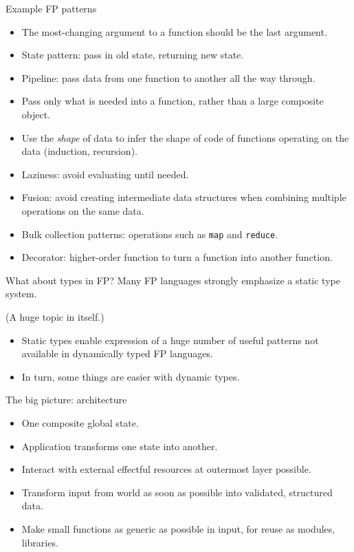 \begin{frame}{Example FP patterns}
  \begin{itemize}
  \item The most-changing argument to a function should be the last argument.
  \item State pattern: pass in old state, returning new state.
  \item Pipeline: pass data from one function to another all
    the way through.
  \item Pass only what is needed into a function, rather than a large
    composite object.
  \item Use the \emph{shape} of data to infer the shape of code of functions
    operating on the data (induction, recursion).
  \item Laziness: avoid evaluating until needed.
  \item Fusion: avoid creating intermediate data structures
    when combining multiple operations on the same data.
  \item Bulk collection patterns: operations such as
    \texttt{map} and \texttt{reduce}.
  \item Decorator: higher-order function to turn a function
    into another function.
  \end{itemize}
\end{frame}

\begin{frame}{What about types in FP?}
  Many FP languages strongly emphasize a static type system.

  (A huge topic in itself.)

  \begin{itemize}
  \item Static types enable expression of a huge number of useful
    patterns not available in dynamically typed FP languages.
  \item In turn, some things are easier with dynamic types.
  \end{itemize}
\end{frame}

\begin{frame}{The big picture: architecture}
  \begin{itemize}
  \item One composite global state.
  \item Application transforms one state into another.
  \item Interact with external effectful resources at outermost layer
    possible.
  \item Transform input from world as soon as possible into validated,
    structured data.
  \item Make small functions as generic as possible in input, for
    reuse as modules, libraries.
  \end{itemize}
\end{frame}

